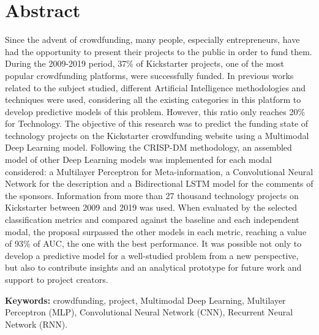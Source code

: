 \chapter*{Abstract}
Since the advent of crowdfunding, many people, especially entrepreneurs, have had the opportunity to present their projects to the public in order to fund them. During the 2009-2019 period, 37\% of Kickstarter projects, one of the most popular crowdfunding platforms, were successfully funded. In previous works related to the subject studied, different Artificial Intelligence methodologies and techniques were used, considering all the existing categories in this platform to develop predictive models of this problem. However, this ratio only reaches 20\% for Technology. The objective of this research was to predict the funding state of technology projects on the Kickstarter crowdfunding website using a Multimodal Deep Learning model. Following the CRISP-DM methodology, an assembled model of other Deep Learning models was implemented for each modal considered: a Multilayer Perceptron for Meta-information, a Convolutional Neural Network for the description and a Bidirectional LSTM model for the comments of the sponsors. Information from more than 27 thousand technology projects on Kickstarter between 2009 and 2019 was used. When evaluated by the selected classification metrics and compared against the baseline and each independent modal, the proposal surpassed the other models in each metric, reaching a value of 93\% of AUC, the one with the best performance. It was possible not only to develop a predictive model for a well-studied problem from a new perspective, but also to contribute insights and an analytical prototype for future work and support to project creators.

\textbf{Keywords: } crowdfunding, project, Multimodal Deep Learning, Multilayer Perceptron (MLP), Convolutional Neural Network (CNN), Recurrent Neural Network (RNN).